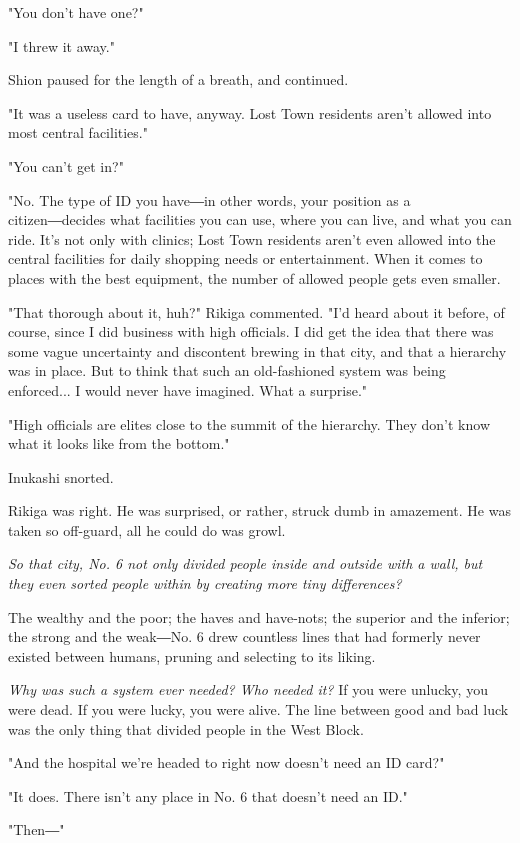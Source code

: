 "You don't have one?"

"I threw it away."

Shion paused for the length of a breath, and continued.

"It was a useless card to have, anyway. Lost Town residents aren't
allowed into most central facilities."

"You can't get in?"

"No. The type of ID you have―in other words, your position as a
citizen―decides what facilities you can use, where you can live, and
what you can ride. It's not only with clinics; Lost Town residents
aren't even allowed into the central facilities for daily shopping needs
or entertainment. When it comes to places with the best equipment, the
number of allowed people gets even smaller.

"That thorough about it, huh?" Rikiga commented. "I'd heard about it
before, of course, since I did business with high officials. I did get
the idea that there was some vague uncertainty and discontent brewing in
that city, and that a hierarchy was in place. But to think that such an
old-fashioned system was being enforced... I would never have imagined.
What a surprise."

"High officials are elites close to the summit of the hierarchy. They
don't know what it looks like from the bottom."

Inukashi snorted.

Rikiga was right. He was surprised, or rather, struck dumb in amazement.
He was taken so off-guard, all he could do was growl.

\emph{So that city, No. 6 not only divided people inside and outside with a
wall, but they even sorted people within by creating more tiny
differences?}

The wealthy and the poor; the haves and have-nots; the superior and the
inferior; the strong and the weak―No. 6 drew countless lines that had
formerly never existed between humans, pruning and selecting to its
liking.

\emph{Why was such a system ever needed? Who needed it?} If you were unlucky,
you were dead. If you were lucky, you were alive. The line between good
and bad luck was the only thing that divided people in the West Block.

"And the hospital we're headed to right now doesn't need an ID card?"

"It does. There isn't any place in No. 6 that doesn't need an ID."

"Then―"

